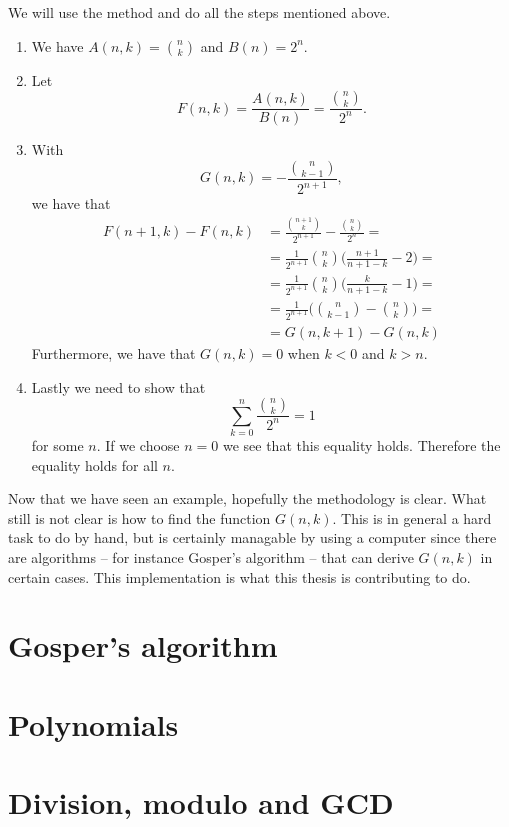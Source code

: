 \begin{solution}
  We will use the method and do all the steps mentioned above.
  \begin{enumerate}
    \item We have $A(n,k)=\binom{n}{k}$ and $B(n)=2^n$.
    \item Let $$F(n,k)=\frac{A(n,k)}{B(n)}=\frac{\binom{n}{k}}{2^n}.$$
    \item With $$G(n,k)=-\frac{\binom{n}{k-1}}{2^{n+1}},$$ we have that
      \begin{equation*}
        \begin{split}
          F(n+1,k)-F(n,k) & = \frac{\binom{n+1}{k}}{2^{n+1}}-\frac{\binom{n}{k}}{2^{n}}= \\
          & = \frac{1}{2^{n+1}}\binom{n}{k}\Bigg(\frac{n+1}{n+1-k}-2\Bigg) = \\
          & = \frac{1}{2^{n+1}}\binom{n}{k}\Bigg(\frac{k}{n+1-k}-1\Bigg) = \\
          & = \frac{1}{2^{n+1}}\Bigg(\binom{n}{k-1}-\binom{n}{k}\Bigg) = \\
          & = G(n,k+1)-G(n,k)
        \end{split}
      \end{equation*}
      Furthermore, we have that $G(n,k) = 0$ when $k<0$ and $k>n$.
    \item Lastly we need to show that $$\sum_{k=0}^n \frac{\binom{n}{k}}{2^n}=1$$ for some $n$. If we choose $n=0$ we see that this equality holds. Therefore the equality holds for all $n$.
  \end{enumerate}
\end{solution}
Now that we have seen an example, hopefully the methodology is clear. What still is not clear is how to find the function $G(n,k)$. This is in general a hard task to do by hand, but is certainly managable by using a computer since there are algorithms -- for instance Gosper's algorithm -- that can derive $G(n,k)$ in certain cases. This implementation is what this thesis is contributing to do. %

\section{Gosper's algorithm}


\section{Polynomials}

\section{Division, modulo and GCD}

